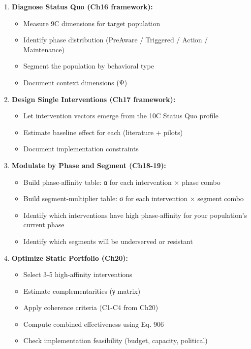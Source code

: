 \begin{enumerate}
\item \textbf{Diagnose Status Quo (Ch16 framework):}
   \begin{itemize}
   \item Measure 9C dimensions for target population
   \item Identify phase distribution (PreAware / Triggered / Action / Maintenance)
   \item Segment the population by behavioral type
   \item Document context dimensions (Ψ)
   \end{itemize}

\item \textbf{Design Single Interventions (Ch17 framework):}
   \begin{itemize}
   \item Let intervention vectors emerge from the 10C Status Quo profile
   \item Estimate baseline effect for each (literature + pilots)
   \item Document implementation constraints
   \end{itemize}

\item \textbf{Modulate by Phase and Segment (Ch18-19):}
   \begin{itemize}
   \item Build phase-affinity table: α for each intervention × phase combo
   \item Build segment-multiplier table: σ for each intervention × segment combo
   \item Identify which interventions have high phase-affinity for your population's current phase
   \item Identify which segments will be underserved or resistant
   \end{itemize}

\item \textbf{Optimize Static Portfolio (Ch20):}
   \begin{itemize}
   \item Select 3-5 high-affinity interventions
   \item Estimate complementarities (γ matrix)
   \item Apply coherence criteria (C1-C4 from Ch20)
   \item Compute combined effectiveness using Eq. 906
   \item Check implementation feasibility (budget, capacity, political)
   \end{itemize}


\end{enumerate}
